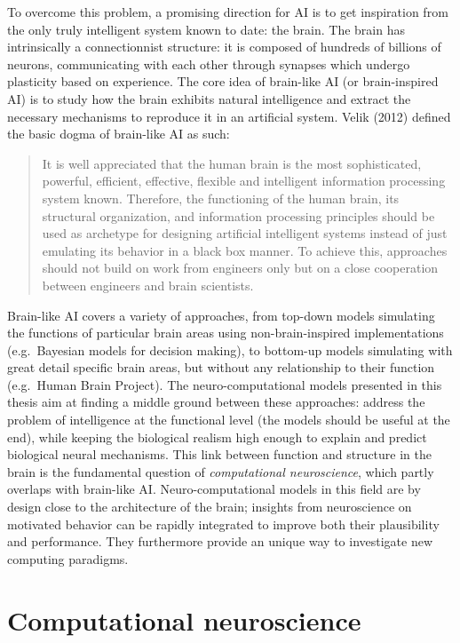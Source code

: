 \documentclass[
  11pt,
  a4paper,
]{scrbook}
\begin{document}
To overcome this problem, a promising direction for AI is to get
inspiration from the only truly intelligent system known to date: the
brain. The brain has intrinsically a connectionnist structure: it is
composed of hundreds of billions of neurons, communicating with each
other through synapses which undergo plasticity based on experience. The
core idea of brain-like AI (or brain-inspired AI) is to study how the
brain exhibits natural intelligence and extract the necessary mechanisms
to reproduce it in an artificial system. Velik (2012) defined the basic
dogma of brain-like AI as such:

\begin{quote}
It is well appreciated that the human brain is the most sophisticated,
powerful, efficient, effective, flexible and intelligent information
processing system known. Therefore, the functioning of the human brain,
its structural organization, and information processing principles
should be used as archetype for designing artificial intelligent systems
instead of just emulating its behavior in a black box manner. To achieve
this, approaches should not build on work from engineers only but on a
close cooperation between engineers and brain scientists.
\end{quote}

Brain-like AI covers a variety of approaches, from top-down models
simulating the functions of particular brain areas using
non-brain-inspired implementations (e.g.~Bayesian models for decision
making), to bottom-up models simulating with great detail specific brain
areas, but without any relationship to their function (e.g.~Human Brain
Project). The neuro-computational models presented in this thesis aim at
finding a middle ground between these approaches: address the problem of
intelligence at the functional level (the models should be useful at the
end), while keeping the biological realism high enough to explain and
predict biological neural mechanisms. This link between function and
structure in the brain is the fundamental question of
\emph{computational neuroscience}, which partly overlaps with brain-like
AI. Neuro-computational models in this field are by design close to the
architecture of the brain; insights from neuroscience on motivated
behavior can be rapidly integrated to improve both their plausibility
and performance. They furthermore provide an unique way to investigate
new computing paradigms.

\section{Computational neuroscience}\label{computational-neuroscience}
\end{document}

